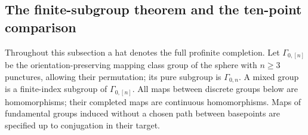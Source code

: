 \subsection{The finite-subgroup theorem and the ten-point comparison}

Throughout this subsection a hat denotes the full profinite completion.
Let $\Gamma_{0,[n]}$ be the orientation-preserving mapping class group
of the sphere with $n\geq3$ punctures, allowing their permutation; its
pure subgroup is $\Gamma_{0,n}$.  A mixed group is a finite-index
subgroup of $\Gamma_{0,[n]}$.  All maps between discrete groups below
are homomorphisms; their completed maps are continuous homomorphisms.
Maps of fundamental groups induced without a chosen path between
basepoints are specified up to conjugation in their target.


